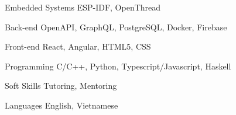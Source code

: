 

\begin{cvskills}

  \cvskill
    {Embedded Systems} %
    {ESP-IDF, OpenThread} %

  \cvskill
    {Back-end} %
    {OpenAPI, GraphQL, PostgreSQL, Docker, Firebase} %

  \cvskill
    {Front-end} %
    {React, Angular, HTML5, CSS} %

  \cvskill
    {Programming} %
    {C/C++, Python, Typescript/Javascript, Haskell} %

  \cvskill
    {Soft Skills} %
    {Tutoring, Mentoring} %


  \cvskill
    {Languages}
    {English, Vietnamese}

\end{cvskills}
